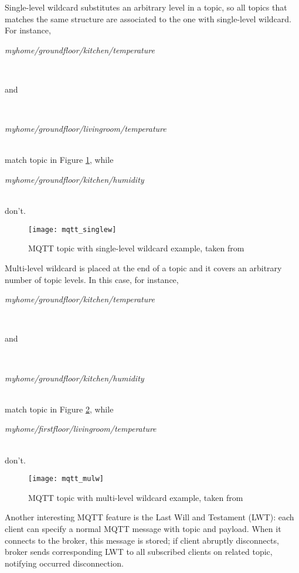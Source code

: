 Single-level wildcard substitutes an arbitrary level in a topic, so all topics that matches the same structure are associated to the one with single-level wildcard.
For instance,\\
\centerline{\textit{myhome\slash{}groundfloor\slash{}kitchen\slash{}temperature}}\\
\centerline{and}\\
\centerline{\textit{myhome\slash{}groundfloor\slash{}livingroom\slash{}temperature}}\\
match topic in Figure \ref{fig:mqtt_singlew}, while\\
\centerline{\textit{myhome\slash{}groundfloor\slash{}kitchen\slash{}humidity}}\\
don't.

\begin{figure}[htb]

    \centering
    \texttt{[image: mqtt\_singlew]}
    \caption{MQTT topic with single-level wildcard example, taken from \cite{site:hivemq}}
    \label{fig:mqtt_singlew}

\end{figure}

Multi-level wildcard is placed at the end of a topic and it covers an arbitrary number of topic levels.
In this case, for instance,\\
\centerline{\textit{myhome\slash{}groundfloor\slash{}kitchen\slash{}tem\-per\-a\-ture}}\\
\centerline{and}\\
\centerline{\textit{myhome\slash{}groundfloor\slash{}kitchen\slash{}humidity}}\\
match topic in Figure \ref{fig:mqtt_mulw}, while\\
\centerline{\textit{myhome\slash{}firstfloor\slash{}livingroom\slash{}temperature}}\\
don't.

\begin{figure}[htb]

    \centering
    \texttt{[image: mqtt\_mulw]}
    \caption{MQTT topic with multi-level wildcard example, taken from \cite{site:hivemq}}
    \label{fig:mqtt_mulw}

\end{figure}

Another interesting MQTT feature is the Last Will and Testament (LWT): each client can specify a normal MQTT message with topic and payload. When it connects to the broker, this message is stored; if client abruptly disconnects, broker sends corresponding LWT to all subscribed clients on related topic, notifying occurred disconnection.





